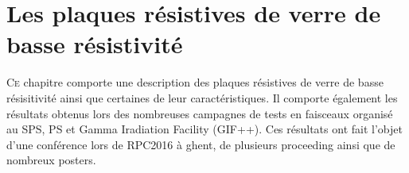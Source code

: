 \chapter{Les plaques résistives de verre de basse résistivité}
\renewcommand\chapterillustration{GLA/gla}
\ThisULCornerWallPaper{1}{\chapterillustration}
\minitoc

\lettrine[lines=4, slope=-0.5em]{C}{e} chapitre comporte une description des plaques résistives de verre de basse résisitivité ainsi que certaines de leur caractéristiques. Il comporte également les résultats obtenus lors des nombreuses campagnes de tests en faisceaux organisé au SPS, PS et Gamma Iradiation Facility (GIF++). Ces résultats ont fait l'objet d'une conférence lors de RPC2016 à ghent, de plusieurs proceeding \cite{Lagarde:2016fvf}\cite{Gouzevitch:2016pcr} ainsi que de nombreux posters.



